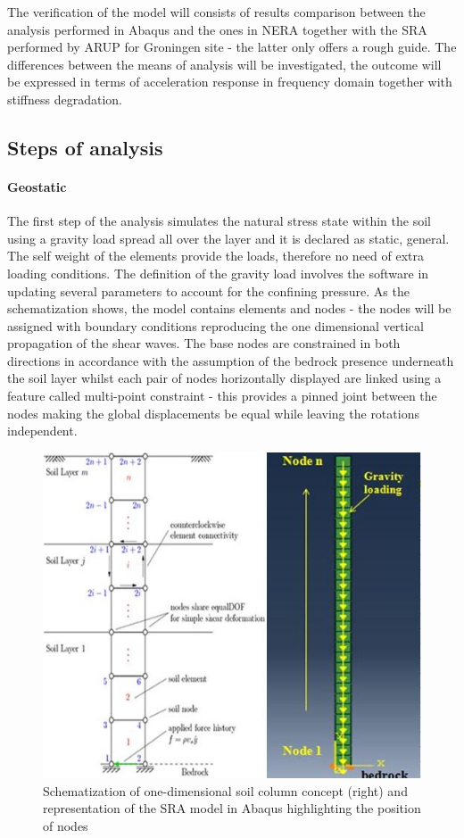 	The verification of the model will consists of results comparison between the analysis performed in Abaqus and the ones in NERA together with the SRA performed by ARUP for Groningen site - the latter only offers a rough guide. The differences between the means of analysis will be investigated, the outcome will be expressed in terms of acceleration response in frequency domain together with stiffness degradation. 
	
	\subsection{Steps of analysis}
	\paragraph{Geostatic} The first step of the analysis simulates the natural stress state within the soil using a gravity load spread all over the layer and it is declared as static, general. The self weight of the elements provide the loads, therefore no need of extra loading conditions. The definition of the gravity load involves the software in updating several parameters to account for the confining pressure. As the schematization shows, the model contains elements and nodes - the nodes will be assigned with boundary conditions reproducing the one dimensional vertical propagation of the shear waves. The base nodes are constrained in both directions in accordance with the assumption of the bedrock presence underneath the soil layer whilst each pair of nodes horizontally displayed are linked using a feature called multi-point constraint - this provides a pinned joint between the nodes making the global displacements be equal while leaving the rotations independent. 
	\begin{figure}
		\centering
		\includegraphics[width=0.6\linewidth]{"Soil column"}
		\caption[]{Schematization of one-dimensional soil column concept (right) and representation of the SRA model in Abaqus highlighting the position of nodes}
		\label{Soilcolumn}
	\end{figure}
	
